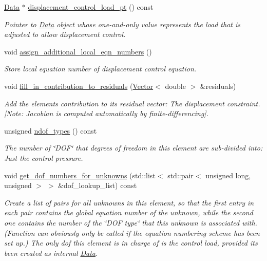 \begin{DoxyCompactItemize}
\hyperlink{classoomph_1_1Data}{Data} $\ast$ \hyperlink{classoomph_1_1DisplacementControlElement_a4bb140bfc80d122542ad52fd0074171f}{displacement\+\_\+control\+\_\+load\+\_\+pt} () const
\begin{DoxyCompactList}\small\item\em Pointer to \hyperlink{classoomph_1_1Data}{Data} object whose one-\/and-\/only value represents the load that is adjusted to allow displacement control. \end{DoxyCompactList}\item 
void \hyperlink{classoomph_1_1DisplacementControlElement_a7911067dbe7a9dcfa3e981c9b6775c54}{assign\+\_\+additional\+\_\+local\+\_\+eqn\+\_\+numbers} ()
\begin{DoxyCompactList}\small\item\em Store local equation number of displacement control equation. \end{DoxyCompactList}\item 
void \hyperlink{classoomph_1_1DisplacementControlElement_a35a463ca767d3b9d17d7256711c8639e}{fill\+\_\+in\+\_\+contribution\+\_\+to\+\_\+residuals} (\hyperlink{classoomph_1_1Vector}{Vector}$<$ double $>$ \&residuals)
\begin{DoxyCompactList}\small\item\em Add the element\textquotesingle{}s contribution to its residual vector\+: The displacement constraint. \mbox{[}Note\+: Jacobian is computed automatically by finite-\/differencing\mbox{]}. \end{DoxyCompactList}\item 
unsigned \hyperlink{classoomph_1_1DisplacementControlElement_aceec0d8fd80fc5d50451e99680306d1a}{ndof\+\_\+types} () const
\begin{DoxyCompactList}\small\item\em The number of \char`\"{}\+D\+O\+F\char`\"{} that degrees of freedom in this element are sub-\/divided into\+: Just the control pressure. \end{DoxyCompactList}\item 
void \hyperlink{classoomph_1_1DisplacementControlElement_a4b076c21ac84aefbb52f4bf0c7a40cc8}{get\+\_\+dof\+\_\+numbers\+\_\+for\+\_\+unknowns} (std\+::list$<$ std\+::pair$<$ unsigned long, unsigned $>$ $>$ \&dof\+\_\+lookup\+\_\+list) const
\begin{DoxyCompactList}\small\item\em Create a list of pairs for all unknowns in this element, so that the first entry in each pair contains the global equation number of the unknown, while the second one contains the number of the \char`\"{}\+D\+O\+F type\char`\"{} that this unknown is associated with. (Function can obviously only be called if the equation numbering scheme has been set up.) The only dof this element is in charge of is the control load, provided it\textquotesingle{}s been created as internal \hyperlink{classoomph_1_1Data}{Data}. \end{DoxyCompactList}\end{DoxyCompactItemize}
